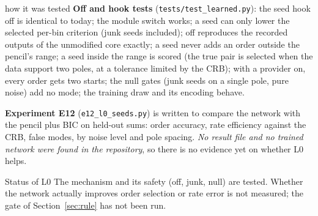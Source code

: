 \begin{explained}{how it was tested}
\textbf{Off and hook tests} (\texttt{tests/test\_learned.py}): the seed hook off is identical to today; the module switch works; a seed can only lower the selected per-bin criterion (junk seeds included); off reproduces the recorded outputs of the unmodified core exactly; a seed never adds an order outside the pencil's range; a seed inside the range is scored (the true pair is selected when the data support two poles, at a tolerance limited by the CRB); with a provider on, every order gets two starts; the null gates (junk seeds on a single pole, pure noise) add no mode; the training draw and its encoding behave.

\medskip\textbf{Experiment E12} (\texttt{e12\_l0\_seeds.py}) is written to compare the network with the pencil plus BIC on held-out sums: order accuracy, rate efficiency against the CRB, false modes, by noise level and pole spacing. \emph{No result file and no trained network were found in the repository}, so there is no evidence yet on whether L0 helps.
\end{explained}

\begin{capbox}{Status of L0}
The mechanism and its safety (off, junk, null) are tested. Whether the network actually improves order selection or rate error is not measured; the gate of Section~\ref{sec:rule} has not been run.
\end{capbox}

